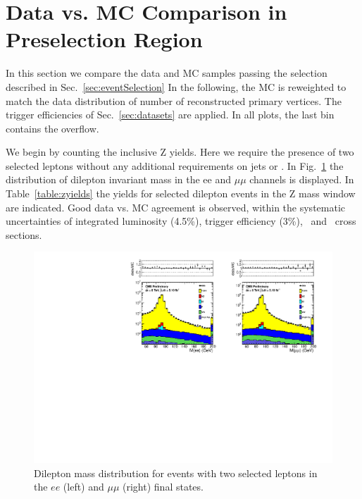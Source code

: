 \clearpage

\section{Data vs. MC Comparison in Preselection Region}
\label{sec:yields}

In this section we compare the data and MC samples passing the selection described in Sec.~\ref{sec:eventSelection}
In the following, the MC is reweighted to match the data distribution of number of reconstructed primary vertices. 
The trigger efficiencies of Sec.~\ref{sec:datasets} are applied. In all plots, the last bin contains the overflow.

We begin by counting the inclusive Z yields. Here we require the presence of two selected leptons without
any additional requirements on jets or \MET. In Fig.~\ref{fig:dilmass} the distribution of dilepton invariant
mass in the ee and $\mu\mu$ channels is displayed. In Table~\ref{table:zyields} the yields for selected dilepton
events in the Z mass window are indicated. Good data vs. MC agreement is observed, within the systematic uncertainties
of integrated luminosity (4.5\%), trigger efficiency (3\%), \zjets\ and \ttbar\ cross sections.

\begin{figure}[hbt]
  \begin{center}
	\includegraphics[width=1.0\linewidth]{plots/dilmass_ee_mm.pdf}
	\caption{
	  \label{fig:dilmass}\protect 
	  Dilepton mass distribution for events with two selected leptons
	  in the $ee$ (left) and $\mu\mu$ (right) final states.}
  \end{center}
\end{figure}


